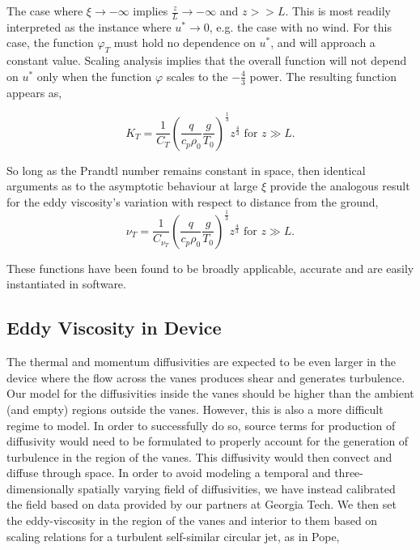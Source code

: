 The case where $\xi \to -\infty $ implies $\frac{z}{L} \to
-\infty $ and $z>>L$. This is most readily interpreted as the instance
where $u^* \to 0$, e.g. the case with no wind. For this case, the
function $\varphi_T$ must hold no dependence on $u^*$, and will approach
a constant value. Scaling analysis implies that the overall function
will not depend on $u^*$ only when the function $\varphi$ scales to the
$-\frac{4}{3}$ power. The resulting function appears as, 

\begin{equation}
 K_T = \frac{1}{C_T} \left( \frac{q}{c_p \rho_0} \frac{g}{T_0}
		     \right)^\frac{1}{3} z^{\frac{4}{3}}  \text{ 
for } z \gg L. 
\end{equation}

So long as the Prandtl number remains constant in space, then
identical arguments as to the asymptotic behaviour at large $\xi$ provide
the analogous result for the eddy viscosity's variation with respect to
distance from the ground,  
\begin{equation}
 \nu_T = \frac{1}{C_{\nu_T}} \left( \frac{q}{c_p \rho_0} \frac{g}{T_0}
			     \right)^\frac{1}{3} z^{\frac{4}{3}}  \text{ 
for } z \gg L. 
\end{equation}

These functions have been found to be broadly applicable, accurate and 
are easily instantiated in software. 

\subsection{Eddy Viscosity in Device}

The thermal and momentum diffusivities are expected to be even larger in the
device where the flow across the vanes produces shear and generates
turbulence. Our model for  
the diffusivities inside the vanes should be higher than the ambient
(and empty) regions outside the vanes. However, this is also a more
difficult regime to model. In order to successfully do so, source terms
for production of diffusivity would need to be formulated to properly
account for the generation of turbulence in the region of the
vanes. This diffusivity would then convect and diffuse through space. In
order to avoid modeling a temporal and three-dimensionally spatially
varying field of diffusivities, we have instead calibrated the field
based on data provided by our partners at Georgia Tech. 
We then set the eddy-viscosity in
the region of the vanes and interior to them based on scaling relations
for a turbulent self-similar circular jet, as in
Pope\cite{pope2000turbulent},
 

